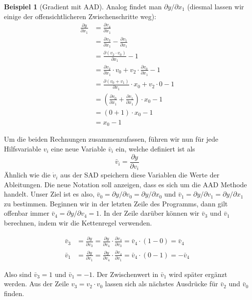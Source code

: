 \documentclass[
  a4paper,
  DIV=11]{scrreprt}
\theoremstyle{definition}
\theoremstyle{definition}
\newtheorem{example}{Beispiel}[chapter]
\theoremstyle{remark}
\begin{document}
\begin{example}[Gradient mit
AAD]
Analog findet man \(\partial y / \partial x_1\) (diesmal lassen wir
einige der offensichtlicheren Zwischenschritte weg): \[
\begin{align*}
    \frac{\partial y}{\partial x_1} &= \frac{\partial v_4}{\partial x_1} \\
    &= \frac{\partial v_3}{\partial x_1} - \frac{\partial v_1}{\partial x_1} \\
    &= \frac{\partial (v_2 \cdot v_0)}{\partial x_1} - 1 \\
    &= \frac{\partial v_2}{\partial x_1} \cdot v_0 + v_2 \cdot \frac{\partial v_0}{\partial x_1} - 1 \\
    &= \frac{\partial (v_0 + v_1)}{\partial x_1} \cdot x_0 + v_2 \cdot 0 - 1 \\
    &= \left( \frac{\partial v_0}{\partial x_1} + \frac{\partial v_1}{\partial x_1} \right) \cdot x_0 - 1 \\
    &= ( 0 + 1) \cdot x_0 - 1 \\
    &= x_0 - 1   
\end{align*}
\]

Um die beiden Rechnungen zusammenzufassen, führen wir nun für jede
Hilfsvariable \(v_i\) eine neue Variable \(\bar v_i\) ein, welche
definiert ist als \[
\bar v_i = \frac{\partial y}{\partial v_i}
\] Ähnlich wie die \(\dot v_i\) aus der SAD speichern diese Variablen
die Werte der Ableitungen. Die neue Notation soll anzeigen, dass es sich
um die AAD Methode handelt. Unser Ziel ist es also,
\(\bar v_0 = \partial y / \partial v_0 = \partial y / \partial x_0\) und
\(\bar v_1 = \partial y / \partial v_1 = \partial y / \partial x_1\) zu
bestimmen. Beginnen wir in der letzten Zeile des Programms, dann gilt
offenbar immer \(\bar v_4 = \partial y / \partial v_4 = 1\). In der
Zeile darüber können wir \(\bar v_3\) und \(\bar v_1\) berechnen, indem
wir die Kettenregel verwenden.

\begin{align*}
    \bar v_3 &= \frac{\partial y}{\partial v_3} = \frac{\partial y}{\partial v_4} \cdot \frac{\partial v_4}{\partial v_3} = \bar v_4 \cdot (1-0)=\bar v_4  \\

    \bar v_1 &= \frac{\partial y}{\partial v_1} = \frac{\partial y}{\partial v_4} \cdot \frac{\partial v_4}{\partial v_1} = \bar v_4 \cdot (0-1)= -\bar v_4
\end{align*}

Also sind \(\bar v_3 = 1\) und \(\bar v_1 = -1\). Der Zwischenwert in
\(\bar v_1\) wird später ergänzt werden. Aus der Zeile
\(v_3 = v_2 \cdot v_0\) lassen sich als nächstes Ausdrücke für
\(\bar v_2\) und \(\bar v_0\) finden.


\end{example}
\end{document}
